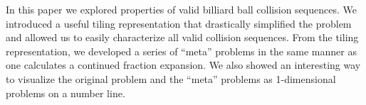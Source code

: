 
In this paper we explored properties of valid billiard ball collision sequences. We introduced a useful tiling representation that drastically simplified the problem and allowed us to easily characterize all valid collision sequences. From the tiling representation, we developed a series of ``meta'' problems in the same manner as one calculates a continued fraction expansion. We also showed an interesting way to visualize the original problem and the ``meta'' problems as 1-dimensional problems on a number line.
